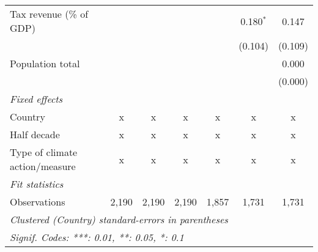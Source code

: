 \begin{tabular}{lcccccc}
   Tax revenue (\% of GDP)                                  &         &         &         &               & 0.180$^{*}$ & 0.147\\   
                                                            &         &         &         &               & (0.104)     & (0.109)\\   
   Population total                                         &         &         &         &               &             & 0.000\\   
                                                            &         &         &         &               &             & (0.000)\\   
   \emph{Fixed effects}\\
   Country                                                  & x       & x       & x       & x             & x           & x\\  
   Half decade                                              & x       & x       & x       & x             & x           & x\\  
   Type of climate action/measure                           & x       & x       & x       & x             & x           & x\\  
   \midrule \emph{Fit statistics}\\
   Observations                                             & 2,190   & 2,190   & 2,190   & 1,857         & 1,731       & 1,731\\  
   \midrule
   \multicolumn{7}{l}{\emph{Clustered (Country) standard-errors in parentheses}}\\
   \multicolumn{7}{l}{\emph{Signif. Codes: ***: 0.01, **: 0.05, *: 0.1}}\\
\end{tabular}
\par\endgroup


